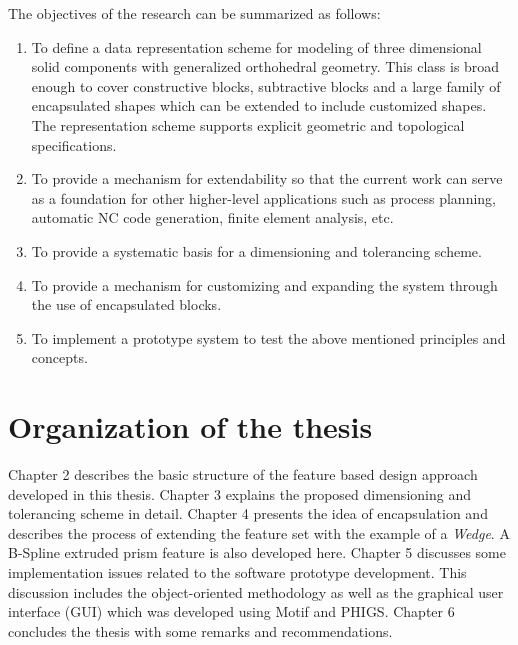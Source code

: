 		The objectives of the research can be summarized as follows:
		\begin{enumerate}
		\item
		To define a data representation scheme for modeling of three
		dimensional solid components with generalized orthohedral geometry.
		This class is broad enough to cover constructive blocks,
		subtractive blocks and a large family of encapsulated shapes
		which can be extended to include customized shapes. 
		The representation scheme supports explicit geometric and 
		topological specifications.

		\item
		To provide a mechanism for extendability so that the current work can
		serve as a foundation for other higher-level applications such as 
		process planning, automatic NC code generation, finite element 
		analysis, etc.
		\item
		To provide a systematic basis for a dimensioning and tolerancing scheme.
		
		\item
		To provide a mechanism for customizing and expanding the system through
		the use of encapsulated blocks.

		\item
		To implement a prototype system to test the above mentioned
		principles and concepts.

		\end{enumerate}	


	\section{Organization of the thesis} 

		Chapter 2 describes the basic structure of the feature based design 
		approach developed in this thesis.
		Chapter 3 explains the proposed dimensioning and tolerancing scheme in 
		detail.
		Chapter 4 presents the idea of encapsulation and describes the process
		of extending the feature set with the example of a {\em Wedge}.
		A B-Spline extruded prism feature is also developed here.
		Chapter 5 discusses some implementation issues related to the
		software prototype 
		development. This discussion includes the object-oriented methodology
		as well as the graphical user interface (GUI) which was developed using 		Motif and PHIGS.
		Chapter 6 concludes the thesis with some remarks and recommendations.

